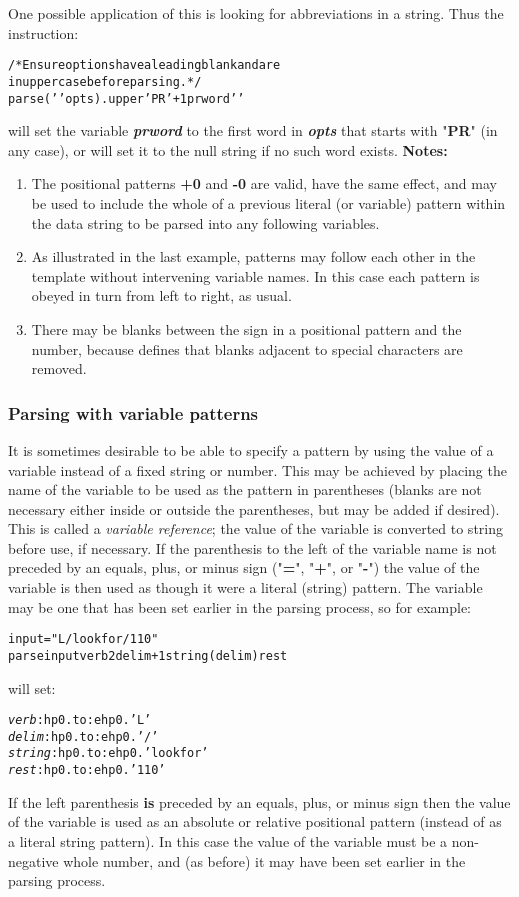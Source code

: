  One possible application of this is looking for abbreviations in a
string. Thus the instruction:
\begin{alltt}
/* Ensure options have a leading blank and are
   in uppercase before parsing. */
parse (' 'opts).upper ' PR' +1 prword ' '
\end{alltt}
will set the variable \textbf{\emph{prword}} to the first word
in \textbf{\emph{opts}} that starts with "\textbf{PR}" (in
any case), or will set it to the null string if no such word exists.
 \textbf{Notes:}
\begin{enumerate}
\item The positional patterns \textbf{+0} and \textbf{-0} are valid,
have the same effect, and may be used to include the whole of a previous
literal (or variable) pattern within the data string to be parsed into
any following variables.
\item As illustrated in the last example, patterns may follow each other
in the template without intervening variable names.  In this case each
pattern is obeyed in turn from left to right, as usual.
\item There may be blanks between the sign in a positional pattern and
the number, because \nr{} defines that blanks adjacent to special
characters are removed.
\end{enumerate}
\subsubsection{Parsing with variable patterns}
 It is sometimes desirable to be able to specify a pattern by using
the value of a variable instead of a fixed string or number.
This may be achieved by placing the name of the variable to be used as
the pattern in parentheses (blanks are not necessary either inside or
outside the parentheses, but may be added if desired).
This is called a \emph{variable reference}; the value of the variable
is converted to string before use, if necessary.
 If the parenthesis to the left of the variable name is not preceded
by an equals, plus, or minus sign ("\textbf{=}",
"\textbf{+}", or "\textbf{-}")
the value of the variable is then used as though it were a literal
(string) pattern.
The variable may be one that has been set earlier in the parsing
process, so for example:
\begin{alltt}
input="L/look for/1 10"
parse input  verb 2 delim +1 string (delim) rest
\end{alltt}
will set:
\begin{alltt}
\emph{verb} :hp0.to:ehp0. 'L'
\emph{delim} :hp0.to:ehp0. '/'
\emph{string} :hp0.to:ehp0. 'look for'
\emph{rest} :hp0.to:ehp0. '1 10'
\end{alltt}
 If the left parenthesis \textbf{is} preceded by an equals, plus,
or minus sign then the value of the variable is used as an absolute or
relative positional pattern (instead of as a literal string pattern).
In this case the value of the variable must be a non-negative
whole number, and (as before) it may have been set earlier in the
parsing process.
\index{,}
\index{,}
\index{,}
\index{,}
